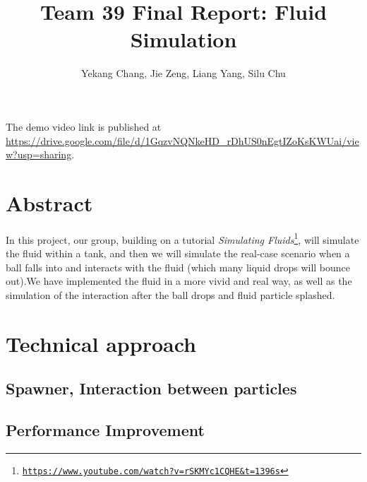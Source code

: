 \documentclass{article}
\title{Team 39 Final Report: Fluid Simulation}
\author{Yekang Chang, Jie Zeng, Liang Yang, Silu Chu}
\newcommand\foothref[3]{#1\footnote{\href{#2}{#3}}}
\begin{document}
\maketitle

The demo video link is published at \url{https://drive.google.com/file/d/1GqzvNQNkeHD_rDhUS0nEgtIZoKsKWUai/view?usp=sharing}.

\section{Abstract}


\hspace*{1em}In this project, our group, building on a tutorial \foothref{\textit{Simulating Fluids}}{https://www.youtube.com/watch?v=rSKMYc1CQHE&t=1396s}{\texttt{https://www.youtube.com/watch?v=rSKMYc1CQHE\&t=1396s}},
  will simulate the fluid within a tank, and then we will simulate the real-case scenario when a ball falls into and interacts with the fluid (which many liquid drops will bounce out).We have implemented the fluid in a more vivid and real way, as well as the simulation of the interaction after the ball drops and fluid particle splashed. 

\section{Technical approach}

\subsection{Spawner, Interaction between particles}


\subsection{Performance Improvement}
\hspace*{1em} 
\end{document}
